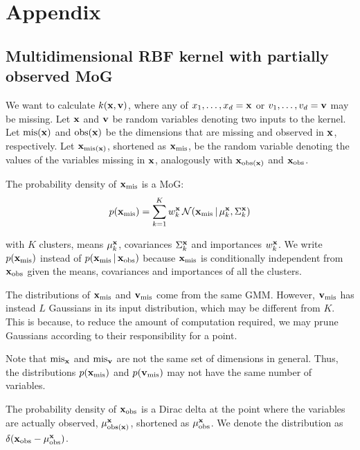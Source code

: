 \documentclass[letterpaper]{article}
\newcommand{\vbar}{\,|\,}
\newcommand{\vx}{{\bf x}}
\newcommand{\vv}{{\bf v}}
\newcommand{\mis}{\text{mis}}
\begin{document}


\section{Appendix}

\subsection{Multidimensional \ac{RBF} kernel with partially observed \ac{MoG}}
We want to calculate $k(\vx, \vv)$, where any of $x_1,\dots,x_d = \vx$ or
$v_1,\dots,v_d = \vv$ may be missing. Let $\vx$ and $\vv$ be random variables denoting
two inputs to the kernel. Let $\text{mis}(\vx)$ and $\text{obs}(\vx)$ be the
dimensions that are missing and observed in $\vx$, respectively. Let
$\vx_{\text{mis}(\vx)}$, shortened as $\vx_\text{mis}$, be the random variable
denoting the values of the variables missing in $\vx$, analogously with
$\vx_{\text{obs}(\vx)}$ and $\vx_\text{obs}$.

The probability density of $\vx_\text{mis}$ is a \acl{MoG}:
\begin{equation*}
  p(\vx_\text{mis} ) = \sum_{k=1}^K w^\vx_k \, \mathcal{N}(\vx_\text{mis} \vbar \mu_k^\vx, \Sigma_k^\vx)
\end{equation*}

with $K$ clusters, means $\mu_k^\vx$, covariances $\Sigma_k^\vx$ and importances
$w_k^\vx$. We write $p(\vx_\text{mis})$ instead of $p(\vx_\text{mis} \vbar
\vx_\text{obs})$ because $\vx_\text{mis}$ is conditionally independent from
$\vx_\text{obs}$ given the means, covariances and importances of all the
clusters.

The distributions of $\vx_\mis$ and $\vv_\mis$ come from the same \ac{GMM}.
However, $\vv_\mis$ has instead $L$ Gaussians in its input distribution, which may be
different from $K$. This is because, to reduce the amount of computation
required, we may prune Gaussians according to their responsibility for a point.

Note that
$\text{mis}_\vx$ and $\text{mis}_\vv$ are not the same set of dimensions in
general. Thus, the distributions $p(\vx_\text{mis})$ and $p(\vv_\text{mis})$ may
not have the same number of variables.

The probability density of $\vx_\text{obs}$ is a Dirac delta at the point where
the variables are actually observed, $\mu^\vx_{\text{obs}(\vx)}$, shortened as
$\mu^\vx_\text{obs}$. We denote the distribution as
$\delta(\vx_\text{obs}-\mu^\vx_\text{obs})$.
\end{document}
